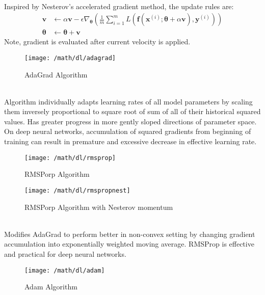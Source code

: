\begin{remark} \\
Inspired by Nesterov's accelerated gradient method, the update rules are:
\begin{align}
\bm{v} &\leftarrow \alpha \bm{v} - \epsilon \nabla_{\bm{\theta}} \left(\frac{1}{m} \sum\limits_{i=1}^m L(\bm{f}(\bm{x}^{(i)}; \bm{\theta} + \alpha \bm{v}), \bm{y}^{(i)}) \right) \nonumber \\
\bm{\theta} &\leftarrow \bm{\theta} + \bm{v} \nonumber
\end{align}
Note, gradient is evaluated after current velocity is applied.
\end{remark}

\begin{figure}[H]
\centering
\texttt{[image: /math/dl/adagrad]}
\caption{AdaGrad Algorithm}
\end{figure}

\begin{remark} \\
Algorithm individually adapts learning rates of all model parameters by scaling them inversely proportional to square root of sum of all of their historical squared values. Has greater progress in more gently sloped directions of parameter space. On deep neural networks, accumulation of squared gradients from beginning of training can result in premature and excessive decrease in effective learning rate.
\end{remark}

\begin{figure}[H]
\centering
\texttt{[image: /math/dl/rmsprop]}
\caption{RMSPorp Algorithm}
\end{figure}

\begin{figure}[H]
\centering
\texttt{[image: /math/dl/rmspropnest]}
\caption{RMSPorp Algorithm with Nesterov momentum}
\end{figure}

\begin{remark} \\
Modifies AdaGrad to perform better in non-convex setting by changing gradient accumulation into exponentially weighted moving average. RMSProp is effective and practical for deep neural networks.
\end{remark}

\begin{figure}[H]
\centering
\texttt{[image: /math/dl/adam]}
\caption{Adam Algorithm}
\end{figure}

